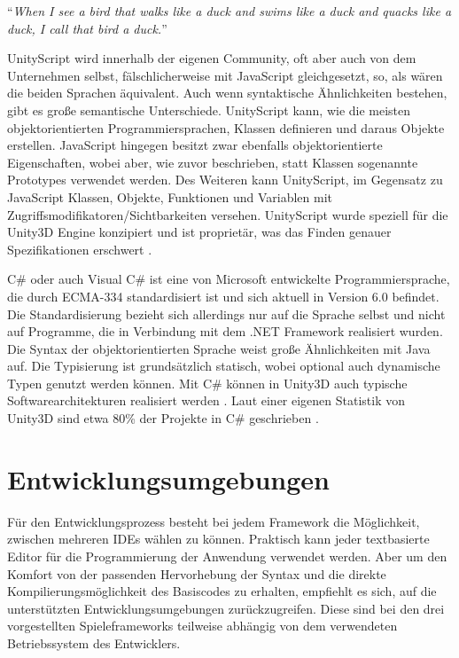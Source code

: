 \bigskip
“\emph{When I see a bird that walks like a duck and swims like a duck and quacks like a duck, I call that bird a duck.}” \citep{ducktest}


\bigskip
UnityScript wird innerhalb der eigenen Community, oft aber auch von dem Unternehmen selbst, fälschlicherweise mit JavaScript gleichgesetzt, so, als wären die beiden Sprachen äquivalent. Auch wenn syntaktische Ähnlichkeiten bestehen, gibt es große semantische Unterschiede.
UnityScript kann, wie die meisten objektorientierten Programmiersprachen, Klassen definieren und daraus Objekte erstellen. JavaScript hingegen besitzt zwar ebenfalls objektorientierte Eigenschaften, wobei aber, wie zuvor beschrieben, statt Klassen sogenannte Prototypes verwendet werden. Des Weiteren kann UnityScript, im Gegensatz zu JavaScript Klassen, Objekte, Funktionen und Variablen mit Zugriffsmodifikatoren/Sichtbarkeiten versehen. UnityScript wurde speziell für die Unity3D Engine konzipiert und ist proprietär, was das Finden genauer Spezifikationen erschwert \citep{unity_unityscript_vs_javascript}. 

\bigskip
C\# oder auch Visual C\# ist eine von Microsoft entwickelte Programmiersprache, die durch ECMA-334 standardisiert ist und sich aktuell in Version 6.0 befindet. Die Standardisierung bezieht sich allerdings nur auf die Sprache selbst und nicht auf Programme, die in Verbindung mit dem .NET Framework realisiert wurden. Die Syntax der objektorientierten Sprache weist große Ähnlichkeiten mit Java auf. Die Typisierung ist grundsätzlich statisch, wobei optional auch dynamische Typen genutzt werden können. Mit C\# können in Unity3D auch typische Softwarearchitekturen realisiert werden \citep{csharp_in_depth}. 
Laut einer eigenen Statistik von Unity3D sind etwa 80\% der Projekte in C\# geschrieben \citep{unity_languages}. 


\section{Entwicklungsumgebungen}
Für den Entwicklungsprozess besteht bei jedem Framework die Möglichkeit, zwischen mehreren IDEs wählen zu können. Praktisch kann jeder textbasierte Editor für die Programmierung der Anwendung verwendet werden. Aber um den Komfort von der passenden Hervorhebung der Syntax und die direkte Kompilierungsmöglichkeit des Basiscodes zu erhalten, empfiehlt es sich, auf die unterstützten Entwicklungsumgebungen zurückzugreifen. Diese sind bei den drei vorgestellten Spieleframeworks teilweise abhängig von dem verwendeten Betriebssystem des Entwicklers.

